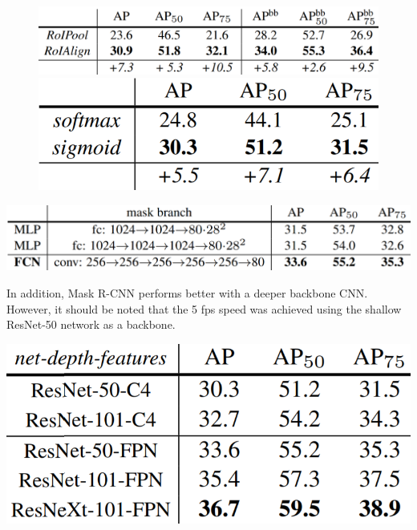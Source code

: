 \documentclass{article}
\begin{document}
\begin{figure}[htbp]
    \centering
    \begin{minipage}{0.55\textwidth}
        \centering
        \includegraphics[width=1\textwidth]{moreroialigncomparison.PNG} %
    \end{minipage}\hfill
    \begin{minipage}{0.35\textwidth}
        \centering
        \includegraphics[width=1\textwidth]{binarymaskcomparison.PNG} %
    \end{minipage}
\end{figure}

\begin{center}
\includegraphics[scale=0.4]{fcncomparison.PNG}
\end{center}

In addition, Mask R-CNN performs better with a deeper backbone CNN. However, it should be noted that the 5 fps speed was achieved using the shallow ResNet-50 network as a backbone.

\begin{center}
\includegraphics[scale=0.4]{backbonecomparison.PNG}
\end{center}
\end{document}
